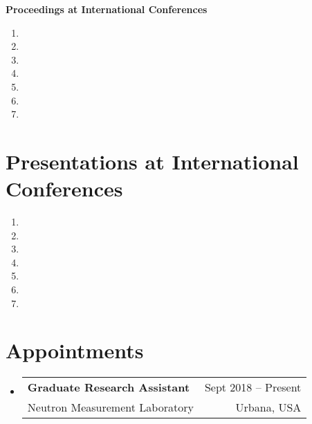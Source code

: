 \documentclass[letterpaper,11pt]{article} %
\makeatletter
\newcommand{\CVSubheading}[4]{
  \vspace{-2pt}\item
    \begin{tabular*}{0.97\textwidth}[t]{l@{\extracolsep{\fill}}r}
      \textbf{#1} & #2 \\
      \small#3 & \small #4 \\
    \end{tabular*}\vspace{-7pt}
}
\newcommand{\CVSubHeadingListStart}{\begin{itemize}[leftmargin=0.5cm, label={}]}
\newcommand{\CVSubHeadingListEnd}{\end{itemize}}
\makeatother
\begin{document}
\hspace{1.5em}\textbf{Proceedings at International Conferences}
\begin{enumerate}
    \item {}
    \item {}
    \item {}
    \item {}
    \item {}
    \item {}
    \item {}
\end{enumerate}

\begin{comment}
Again the title should have already been enough, but if it is necessary to add
descriptions maintain the consistency from prior sections
\end{comment}
\section{Presentations at International Conferences}
    \begin{enumerate}
        \item {}
        \item {}
        \item {}
        \item {}
        \item {}
        \item {}
        \item {}
    \end{enumerate}
 
\begin{comment}
Section is here as it applied to my application for positions in academia. 
Remember to tailor the resume for to the position.
\end{comment}
\section{Appointments}
\CVSubHeadingListStart
    \CVSubheading
      {Graduate Research Assistant}{Sept 2018 – Present}
      {Neutron Measurement Laboratory}{Urbana, USA}
  \CVSubHeadingListEnd
\end{document}
